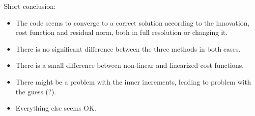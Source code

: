 \documentclass[francais]{beamer}
\begin{document}
\begin{frame}{Short conclusion:}
\begin{itemize}
 \item The code seems to converge to a correct solution according to the innovation, cost function and residual norm, both in full resolution or changing it.
 \item There is no significant difference between the three methods in both cases.
 \item There is a small difference between non-linear and linearized cost functions.
 \item There might be a problem with the inner increments, leading to problem with the guess (?).
 \item Everything else seems OK.
\end{itemize}
\end{frame}






\usebackgroundtemplate{}
\end{document}
